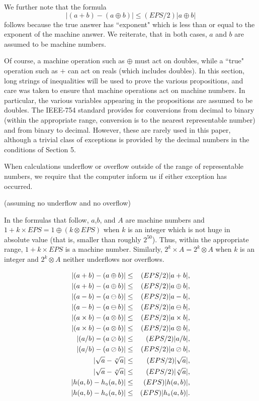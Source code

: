 \begin{conventions}
We further note that the formula 
$$|(a + b) - (a \oplus b)| \leq (EPS/2) |a \oplus b|$$
follows because the true answer has ``exponent" which is less than or equal to the exponent of the machine answer.  We reiterate, that in both cases, $a$ and $b$ are assumed to be machine numbers.

Of course, a machine operation such as $\oplus$ must act on doubles, while a ``true" operation such as $+$ can act on reals (which includes doubles).
In this section, long strings of inequalities will be used to prove the various propositions, and care was taken to ensure that machine operations act on machine numbers.  In particular, the various variables appearing in the propositions are assumed to be doubles. The IEEE-754 standard provides for conversions from decimal to binary (within the appropriate range, conversion is to the nearest representable number) and from binary to decimal.  However, these are rarely used in this paper, although a trivial class of exceptions is provided by the decimal numbers in the conditions of
Section 5.

When calculations underflow or overflow outside of the range of representable numbers, we require that the computer inform us if either exception has occurred. \end{conventions} 

\begin{basic properties} \label{GMT basic7.0}(assuming no underflow and no overflow)

In the formulas that follow, $a$,$b$, and $A$ are machine numbers and
$1 + k \times EPS = 1 \oplus (k \otimes EPS)$ when $k$ is an integer which is not huge in absolute value (that is, 
smaller than roughly $2^{50}$).  Thus, within the appropriate range,  $1 + k \times EPS$ is a machine number.  Similarly,
$2^k
\times A = 2^k \otimes A$ when $k$ is an integer and  $2^k \otimes A$ neither underflows nor overflows.\end{basic properties}
\begin{eqnarray*}
|(a + b) - (a \oplus b)| &\leq& (EPS/2) |a + b|,\\
|(a + b) - (a \oplus b)|&\leq& (EPS/2) |a \oplus b|,\\
|(a - b) - (a \ominus b)| &\leq& (EPS/2) |a - b|,\\
|(a - b) - (a \ominus b)|&\leq& (EPS/2) |a \ominus b|,\\
|(a \times b) - (a \otimes b)| &\leq& (EPS/2) |a \times b|,\\
|(a \times b) - (a \otimes b)| &\leq&(EPS/2) |a \otimes b|,\\
|(a / b) - (a \oslash b)| &\leq& (EPS/2) |a / b|,\\
|(a / b) - (a \oslash b)| &\leq& (EPS/2) |a \oslash b|,\\
|\sqrt a - \root o \of a| &\leq& (EPS/2) |\sqrt a|,\\
|\sqrt a - \root o \of a|  &\leq&  (EPS/2) |\root o \of a|,\\
|h(a,b) - h_\circ(a,b)| &\leq& (EPS) |h(a,b)|,\\
|h(a,b) - h_\circ(a,b)| &\leq&   (EPS) |h_\circ(a,b)|.
\end{eqnarray*}

